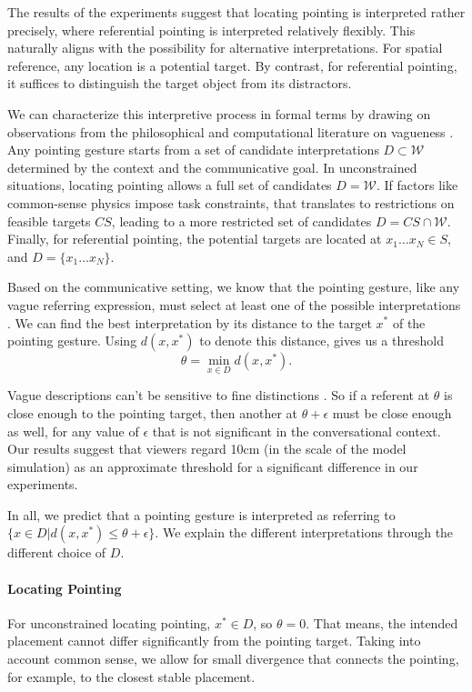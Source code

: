 \documentclass[letterpaper]{article} %
\begin{document}
The results of the experiments suggest that locating pointing is interpreted rather precisely, where referential pointing is interpreted relatively flexibly.  This naturally aligns with the possibility for alternative interpretations.  For spatial reference, any location is a potential target.  By contrast, for referential pointing, it suffices to distinguish the target object from its distractors.

We can characterize this interpretive process in formal terms by drawing on observations from the philosophical and computational literature on vagueness \cite{devault2004interpreting,graff2000shifting,kyburg2000fitting}.  Any pointing gesture starts from a set of candidate interpretations $D \subset \mathcal{W}$ determined by the context and the communicative goal.  In unconstrained situations, locating pointing allows a full set of candidates $D = \mathcal{W}.$  If factors like common-sense physics impose task constraints, that translates to restrictions on feasible targets $CS$, leading to a more restricted set of candidates $D = CS \cap \mathcal{W}$.  Finally, for referential pointing, the potential targets are located at $x_1 \ldots x_N \in S$, and $D = \{ x_1 \ldots x_N \}.$

Based on the communicative setting, we know that the pointing gesture, like any vague referring expression, must select at least one of the possible interpretations \cite{kyburg2000fitting}.  We can find the best interpretation by its distance to the target $x^*$ of the pointing gesture.  Using $d(x,x^*)$ to denote this distance, gives us a threshold $$\theta = \min_{x \in D} d(x, x^*).$$

Vague descriptions can't be sensitive to fine distinctions \cite{graff2000shifting}.  So if a referent at $\theta$ is close enough to the pointing target, then another at $\theta + \epsilon$ must be close enough as well, for any value of $\epsilon$ that is not significant in the conversational context. Our results suggest that viewers regard 10cm (in the scale of the model simulation) as an approximate threshold for a significant difference in our experiments.

In all, we predict that a pointing gesture is interpreted as referring to $\{x \in D | d(x,x^*) \leq \theta + \epsilon\}.$  We explain the different interpretations through the different choice of $D$.

\paragraph{Locating Pointing}  For unconstrained locating pointing, $x^* \in D$, so $\theta=0$.  That means, the intended placement cannot differ significantly from the pointing target.  Taking into account common sense, we allow for small divergence that connects the pointing, for example, to the closest stable placement.
\end{document}
